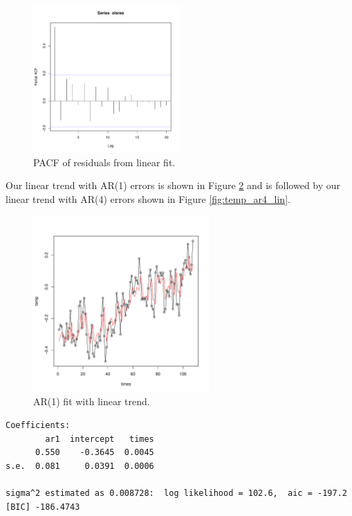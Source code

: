 \documentclass[12pt]{article}
\newenvironment{solution}[2][Solution]{\begin{trivlist}
	\item[\hskip \labelsep {\bfseries #1}]}{\end{trivlist}}
\begin{document}
\begin{solution}{}
	\begin{figure}[H]
    		\centering
    		\includegraphics[width=0.5\textwidth]{figs/problem_6/temp_pacf.pdf}
    		\caption{PACF of residuals from linear fit.}
    		\label{fig:temp_pacf}
	\end{figure}
	

	Our linear trend with AR(1) errors is shown in Figure \ref{fig:temp_ar1_lin} and is followed by  our linear trend with AR(4) errors shown in Figure \ref{fig:temp_ar4_lin}.

	\begin{figure}[H]
    		\centering
    		\includegraphics[width=0.6\textwidth]{figs/problem_6/temp_ar1_lin.pdf}
    		\caption{AR(1) fit with linear trend.}
    		\label{fig:temp_ar1_lin}
	\end{figure}
	
	\begin{lstlisting}
Coefficients:
        ar1  intercept   times
      0.550    -0.3645  0.0045
s.e.  0.081     0.0391  0.0006

sigma^2 estimated as 0.008728:  log likelihood = 102.6,  aic = -197.2
[BIC] -186.4743


\end{lstlisting}
\end{solution}
\end{document}
